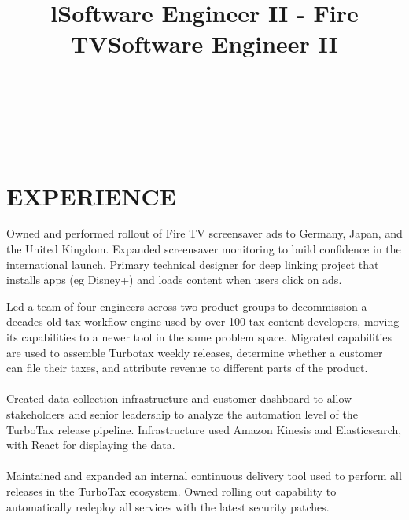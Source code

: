 \documentclass[margin]{res}
\begin{document}
\begin{resume}

\begin{format}
\title{l}\\
\\
\body\\
\end{format}

\section{EXPERIENCE}

\title{\textbf{Software Engineer II - Fire TV}}
\begin{position}
Owned and performed rollout of Fire TV screensaver ads to Germany, Japan, and the United Kingdom. Expanded screensaver monitoring to build confidence in the international launch. Primary technical designer for deep linking project that installs apps (eg Disney+) and loads content when users click on ads. 
\end{position}

\title{\textbf{Software Engineer II}}
\begin{position}
Led a team of four engineers across two product groups to decommission a decades old tax workflow engine used by over 100 tax content developers, moving its capabilities to a newer tool in the same problem space. Migrated capabilities are used to assemble Turbotax weekly releases, determine whether a customer can file their taxes, and attribute revenue to different parts of the product.
\\
\\
Created data collection infrastructure and customer dashboard to allow stakeholders and senior leadership to analyze the automation level of the TurboTax release pipeline. Infrastructure used Amazon Kinesis and Elasticsearch, with React for displaying the data.
\\
\\
Maintained and expanded an internal continuous delivery tool used to perform all releases in the TurboTax ecosystem. Owned rolling out capability to automatically redeploy all services with the latest security patches.
\end{position}


\end{resume}
\end{document}
